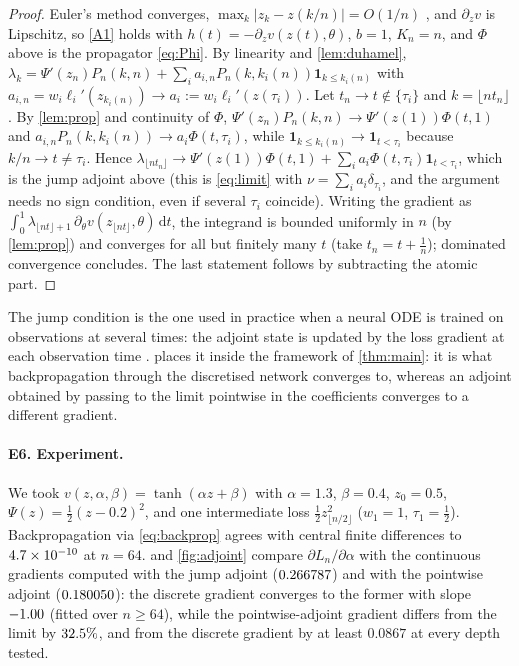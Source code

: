 \documentclass[11pt]{article}
\theoremstyle{definition}
\theoremstyle{remark}
\newcommand{\dd}{\,\mathrm{d}}
\newcommand{\1}{\mathbf{1}}
\newcommand{\fl}[1]{\lfloor #1\rfloor}
\begin{document}
\begin{proof}
Euler's method converges, $\max_k|z_k-z(k/n)|=O(1/n)$ \cite{HNW93}, and $\partial_zv$ is Lipschitz,
so \ref{A1} holds with $h(t)=-\partial_zv(z(t),\theta)$, $b=1$, $K_n=n$, and $\Phi$ above is the
propagator \eqref{eq:Phi}. By linearity and \cref{lem:duhamel},
$\lambda_k=\Psi'(z_n)P_n(k,n)+\sum_i a_{i,n}P_n(k,k_i(n))\1_{k\le k_i(n)}$ with
$a_{i,n}=w_i\ell_i'(z_{k_i(n)})\to a_i:=w_i\ell_i'(z(\tau_i))$. Let $t_n\to t\notin\{\tau_i\}$ and
$k=\fl{nt_n}$. By \cref{lem:prop} and continuity of $\Phi$, $\Psi'(z_n)P_n(k,n)\to\Psi'(z(1))\Phi(t,1)$
and $a_{i,n}P_n(k,k_i(n))\to a_i\Phi(t,\tau_i)$, while $\1_{k\le k_i(n)}\to\1_{t<\tau_i}$ because
$k/n\to t\neq\tau_i$. Hence $\lambda_{\fl{nt_n}}\to\Psi'(z(1))\Phi(t,1)+\sum_ia_i\Phi(t,\tau_i)\1_{t<\tau_i}$,
which is the jump adjoint above (this is \eqref{eq:limit} with $\nu=\sum_ia_i\delta_{\tau_i}$, and the
argument needs no sign condition, even if several $\tau_i$ coincide). Writing the gradient as
$\int_0^1\lambda_{\fl{nt}+1}\,\partial_\theta v(z_{\fl{nt}},\theta)\dd t$, the integrand is bounded
uniformly in $n$ (by \cref{lem:prop}) and converges for all but finitely many $t$ (take $t_n=t+\frac1n$);
dominated convergence concludes. The last statement follows by subtracting the atomic part.
\end{proof}

The jump condition is the one used in practice when a neural ODE is trained on observations at
several times: the adjoint state is updated by the loss gradient at each observation time
\cite{CRBD18,RCD19}.  places it inside the framework of \cref{thm:main}: it is what
backpropagation through the discretised network converges to, whereas an adjoint obtained by
passing to the limit pointwise in the coefficients converges to a different gradient.

\paragraph{E6. Experiment.} We took $v(z,\alpha,\beta)=\tanh(\alpha z+\beta)$ with $\alpha=1.3$,
$\beta=0.4$, $z_0=0.5$, $\Psi(z)=\frac12(z-0.2)^2$, and one intermediate loss
$\frac12z_{\fl{n/2}}^2$ ($w_1=1$, $\tau_1=\frac12$). Backpropagation via \eqref{eq:backprop} agrees
with central finite differences to $4.7\times10^{-10}$ at $n=64$.  and \cref{fig:adjoint}
compare $\partial L_n/\partial\alpha$ with the continuous gradients computed with the jump adjoint
($0.266787$) and with the pointwise adjoint ($0.180050$): the discrete gradient converges to
the former with slope $-1.00$ (fitted over $n\ge64$), while the pointwise-adjoint gradient differs
from the limit by $32.5\%$, and from the discrete gradient by at least $0.0867$ at every depth
tested.
\end{document}
